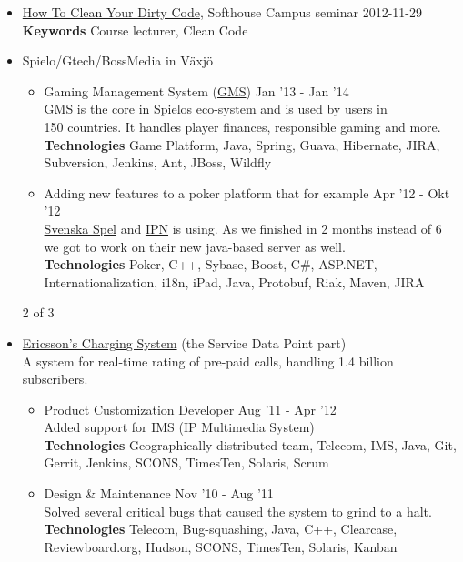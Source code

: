\documentclass[overlapped]{res}
\begin{document}
\begin{resume}
\begin{itemize}
\item \href{https://github.com/jontejj/how-to-clean-your-dirty-code}{How To Clean Your Dirty Code}, Softhouse Campus seminar \hfill 2012-11-29
\\{\bf Keywords} Course lecturer,  Clean Code
\\
\item Spielo/Gtech/BossMedia in Växjö
    \begin{itemize}
    \itemsep -1pt
    \item Gaming Management System (\href{http://www.spielog2.com/products/spielo-g2-gaming-management-system-(gms).aspx}{GMS}) \hfill Jan '13 - Jan '14
    \\GMS is the core in Spielos eco-system and is used  by users in
    \\150 countries. It handles player finances, responsible gaming and more.  
    \\{\bf Technologies} Game Platform, Java, Spring, Guava, Hibernate, JIRA, 
    \\Subversion, Jenkins, Ant, JBoss, Wildfly
    \itemsep -1pt
    \item Adding new features to a poker platform that for example \hfill Apr '12 - Okt '12 
    \\ \href{http://www.svenskaspel.se/poker}{Svenska Spel} and \href{http://www.ipnpoker.com/}{IPN} is using.  As we finished in 2 months instead of 6 
    \\we got to work on their new java-based server as well.
    \\{\bf Technologies} Poker, C++, Sybase, Boost, C\#, ASP.NET, 
    \\Internationalization, i18n, iPad, Java, Protobuf, Riak, Maven, JIRA
    \end{itemize}

\vspace{3.8cm}
\centerline{2 of 3}
\newpage

\item \href{http://www.ericsson.com}{Ericsson's Charging System} (the Service Data Point part)
\\A system for real-time rating of pre-paid calls, handling 1.4 billion subscribers.
\begin{itemize}
\itemsep -1pt
\item Product Customization Developer \hfill Aug '11 - Apr '12
    \\Added support for IMS (IP Multimedia System)
    \\{\bf Technologies} Geographically distributed team, Telecom, IMS, Java, Git,
    \\Gerrit, Jenkins, SCONS, TimesTen, Solaris, Scrum
\item Design \& Maintenance \hfill Nov '10 - Aug '11
    \\Solved several critical bugs that caused the system to grind to a halt.
    \\{\bf Technologies} Telecom, Bug-squashing, Java, C++, Clearcase, 
    \\Reviewboard.org, Hudson, SCONS, TimesTen, Solaris, Kanban
\end{itemize}
\end{itemize}


\end{resume}
\end{document}
